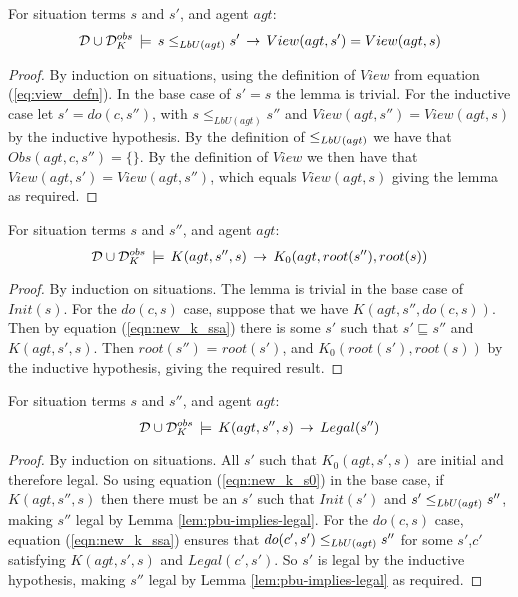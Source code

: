 \begin{lemma}
\label{lem:pbu-implies-view}For situation terms $s$ and $s'$, and
agent $agt$:\[
\mathcal{D}\cup\mathcal{D}_{K}^{obs}\,\models\, s\leq_{LbU(agt)}s'\,\rightarrow\, View(agt,s')=View(agt,s)\]

\end{lemma}
\begin{proof}
By induction on situations, using the definition of $View$ from equation
(\ref{eq:view_defn}). In the base case of $s'=s$ the lemma is trivial.
For the inductive case let $s'=do(c,s'')$, with $s\leq_{LbU(agt)}s''$
and $View(agt,s'')=View(agt,s)$ by the inductive hypothesis. By the
definition of $\leq_{LbU(agt)}$ we have that $Obs(agt,c,s'')=\{\}$.
By the definition of $View$ we then have that $View(agt,s')=View(agt,s'')$,
which equals $View(agt,s)$ giving the lemma as required. 
\end{proof}
\medskip{}


\begin{lemma}
\label{lem:K-implies-root}For situation terms $s$ and $s''$, and
agent $agt$:\[
\mathcal{D}\cup\mathcal{D}_{K}^{obs}\,\models\, K(agt,s'',s)\,\rightarrow\, K_{0}(agt,root(s''),root(s))\]

\end{lemma}
\begin{proof}
By induction on situations. The lemma is trivial in the base case
of $Init(s)$. For the $do(c,s)$ case, suppose that we have $K(agt,s'',do(c,s))$.
Then by equation (\ref{eqn:new_k_ssa}) there is some $s'$ such that
$s'\sqsubseteq s''$ and $K(agt,s',s)$. Then $root(s'')$ = $root(s')$,
and $K_{0}(root(s'),root(s))$ by the inductive hypothesis, giving
the required result. 
\end{proof}
\medskip{}


\begin{lemma}
\label{lem:K-implies-legal}For situation terms $s$ and $s''$, and
agent $agt$:\[
\mathcal{D}\cup\mathcal{D}_{K}^{obs}\,\models\, K(agt,s'',s)\,\rightarrow\, Legal(s'')\]

\end{lemma}
\begin{proof}
By induction on situations. All $s'$ such that $K_{0}(agt,s',s)$
are initial and therefore legal. So using equation (\ref{eqn:new_k_s0})
in the base case, if $K(agt,s'',s)$ then there must be an $s'$ such
that $Init(s')$ and $s'\leq_{LbU(agt)}s''$, making $s''$ legal
by Lemma \ref{lem:pbu-implies-legal}. For the $do(c,s)$ case, equation
(\ref{eqn:new_k_ssa}) ensures that $do(c',s')\leq_{LbU(agt)}s''$
for some $s'$,$c'$ satisfying $K(agt,s',s)$ and $Legal(c',s')$.
So $s'$ is legal by the inductive hypothesis, making $s''$ legal
by Lemma \ref{lem:pbu-implies-legal} as required. 
\end{proof}
\medskip{}


